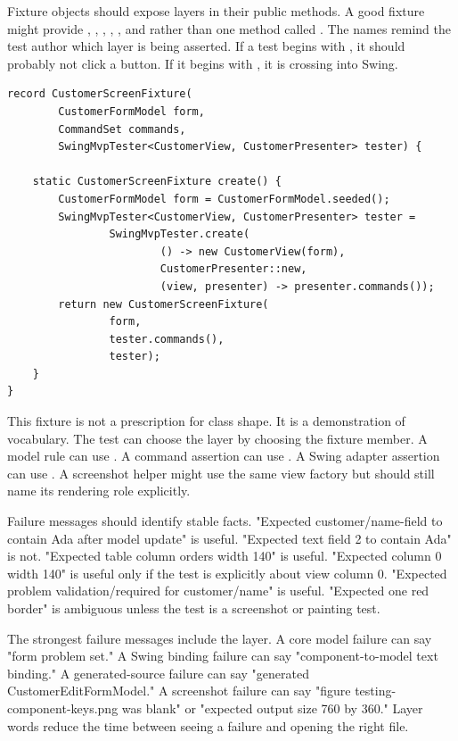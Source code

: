 Fixture objects should expose layers in their public methods. A good fixture might provide , , , , , and  rather than one method called . The names remind the test author which layer is being asserted. If a test begins with , it should probably not click a button. If it begins with , it is crossing into Swing.

\begin{lstlisting}[caption={A fixture that keeps model, Swing, and screenshot roles visible.}]
record CustomerScreenFixture(
        CustomerFormModel form,
        CommandSet commands,
        SwingMvpTester<CustomerView, CustomerPresenter> tester) {

    static CustomerScreenFixture create() {
        CustomerFormModel form = CustomerFormModel.seeded();
        SwingMvpTester<CustomerView, CustomerPresenter> tester =
                SwingMvpTester.create(
                        () -> new CustomerView(form),
                        CustomerPresenter::new,
                        (view, presenter) -> presenter.commands());
        return new CustomerScreenFixture(
                form,
                tester.commands(),
                tester);
    }
}
\end{lstlisting}

This fixture is not a prescription for class shape. It is a demonstration of vocabulary. The test can choose the layer by choosing the fixture member. A model rule can use . A command assertion can use . A Swing adapter assertion can use . A screenshot helper might use the same view factory but should still name its rendering role explicitly.

Failure messages should identify stable facts. "Expected customer/name-field to contain Ada after model update" is useful. "Expected text field 2 to contain Ada" is not. "Expected table column orders width 140" is useful. "Expected column 0 width 140" is useful only if the test is explicitly about view column 0. "Expected problem validation/required for customer/name" is useful. "Expected one red border" is ambiguous unless the test is a screenshot or painting test.

The strongest failure messages include the layer. A core model failure can say "form problem set." A Swing binding failure can say "component-to-model text binding." A generated-source failure can say "generated CustomerEditFormModel." A screenshot failure can say "figure testing-component-keys.png was blank" or "expected output size 760 by 360." Layer words reduce the time between seeing a failure and opening the right file.

